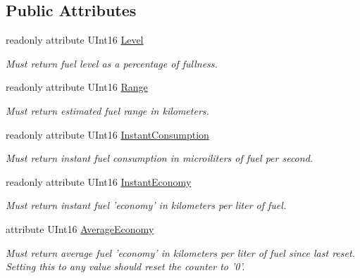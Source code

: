 \subsection*{Public Attributes}
\begin{DoxyCompactItemize}
\item 
readonly attribute U\-Int16 \hyperlink{interfaceVehicle_1_1org_1_1automotive_1_1Fuel_a5821c2207920d786362f126ec78ac3a3}{Level}
\begin{DoxyCompactList}\small\item\em Must return fuel level as a percentage of fullness. \end{DoxyCompactList}\item 
readonly attribute U\-Int16 \hyperlink{interfaceVehicle_1_1org_1_1automotive_1_1Fuel_af113abbea5ffeca53c9d267319de39e9}{Range}
\begin{DoxyCompactList}\small\item\em Must return estimated fuel range in kilometers. \end{DoxyCompactList}\item 
readonly attribute U\-Int16 \hyperlink{interfaceVehicle_1_1org_1_1automotive_1_1Fuel_aa8ade0a03a293082ca0dd47018f562c2}{Instant\-Consumption}
\begin{DoxyCompactList}\small\item\em Must return instant fuel consumption in microiliters of fuel per second. \end{DoxyCompactList}\item 
readonly attribute U\-Int16 \hyperlink{interfaceVehicle_1_1org_1_1automotive_1_1Fuel_a1c49611a6ebc45b76c8a692bcfe4da37}{Instant\-Economy}
\begin{DoxyCompactList}\small\item\em Must return instant fuel 'economy' in kilometers per liter of fuel. \end{DoxyCompactList}\item 
attribute U\-Int16 \hyperlink{interfaceVehicle_1_1org_1_1automotive_1_1Fuel_a7f43ff6e1f43b6d585f8b55140f4b06c}{Average\-Economy}
\begin{DoxyCompactList}\small\item\em Must return average fuel 'economy' in kilometers per liter of fuel since last reset. Setting this to any value should reset the counter to '0'. \end{DoxyCompactList}\end{DoxyCompactItemize}


